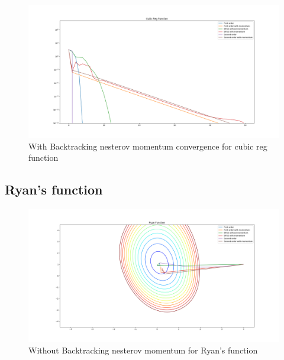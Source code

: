 \documentclass{article}
\begin{document}
\begin{figure}[H]
	\includegraphics[width=\linewidth]{../Images/cubicregbacktrack1.png}
	\caption{With Backtracking nesterov momentum convergence for cubic reg function}
	\label{fig:With Backtracking nesterov momentum convergence for cubic reg function}
\end{figure}

\subsection{Ryan's function}

\begin{figure}[H]
	\includegraphics[width=\linewidth]{../Images/ryannesterov.png}
	\caption{Without Backtracking nesterov momentum for Ryan's function}
	\label{fig:Without Backtracking nesterov momentum for Ryan's function}
\end{figure}
\end{document}
